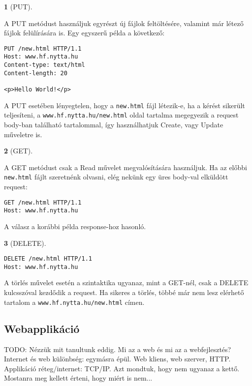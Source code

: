 \documentclass[a4paper, 12pt, oneside]{article}
\newtheorem*{defin}{}
\begin{document}
\begin{center}
\begin{defin}[PUT]
\end{defin}
\end{center}

A PUT metódust használjuk egyrészt új fájlok feltöltésére, valamint már létező fájlok felülírására is. Egy egyszerű példa a következő:

\begin{verbatim}
PUT /new.html HTTP/1.1
Host: www.hf.nytta.hu
Content-type: text/html
Content-length: 20

<p>Hello World!</p>
\end{verbatim}

A PUT esetében lényegtelen, hogy a \verb|new.html| fájl létezik-e, ha a kérést sikerült teljesíteni, a \verb|www.hf.nytta.hu/new.html| oldal tartalma megegyezik a request body-ban található tartalommal, így használhatjuk Create, vagy Update műveletre is.

\begin{center}
\begin{defin}[GET]
\end{defin}
\end{center}

A GET metódust csak a Read művelet megvalósítására használjuk. Ha az előbbi \verb|new.html| fájlt szeretnénk olvasni, elég nekünk egy üres body-val elküldött request:

\begin{verbatim}
GET /new.html HTTP/1.1
Host: www.hf.nytta.hu
\end{verbatim}

A válasz a korábbi példa response-hoz hasonló.
\pagebreak
\begin{center}
\begin{defin}[DELETE]
\end{defin}
\end{center}

\begin{verbatim}
DELETE /new.html HTTP/1.1
Host: www.hf.nytta.hu
\end{verbatim}

A törlés művelet esetén a szintaktika ugyanaz, mint a GET-nél, csak a DELETE kulcsszóval kezdődik a request. Ha sikeres a törlés, többé már nem lesz elérhető tartalom a \verb|www.hf.nytta.hu/new.html| címen.

\subsection*{Webapplikáció}

TODO: Nézzük mit tanultunk eddig. Mi az a web és mi az a webfejlesztés? Internet és web különbség: egymásra épül. Web kliens, web szerver, HTTP. Applikáció réteg/internet: TCP/IP. Azt mondtuk, hogy nem ugyanaz a kettő. Mostanra meg kellett érteni, hogy miért is nem...
\end{document}

